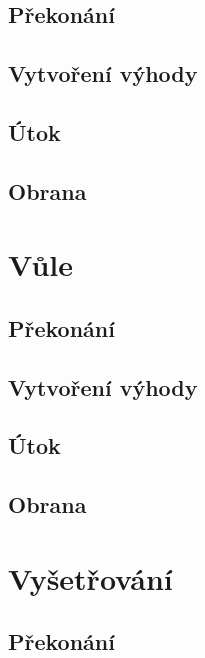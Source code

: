 \documentclass[../main.tex]{subfiles}
\begin{document}
\subsection*{Překonání}
\label{subsec:ucenost-prekonani}
\prekonani

\subsection*{Vytvoření výhody}
\label{subsec:ucenost-vytvoreni}
\vytvoreni

\subsection*{Útok}
\label{subsec:ucenost-utok}
\utok

\subsection*{Obrana}
\label{subsec:ucenost-obrana}
\obrana

\section{Vůle}
\label{sec:vule}

\subsection*{Překonání}
\label{subsec:vule-prekonani}
\prekonani

\subsection*{Vytvoření výhody}
\label{subsec:vule-vytvoreni}
\vytvoreni

\subsection*{Útok}
\label{subsec:vule-utok}
\utok

\subsection*{Obrana}
\label{subsec:vule-obrana}
\obrana

\section{Vyšetřování}
\label{sec:vysetrovani}

\subsection*{Překonání}
\label{subsec:vysetrovani-prekonani}
\prekonani
\end{document}
